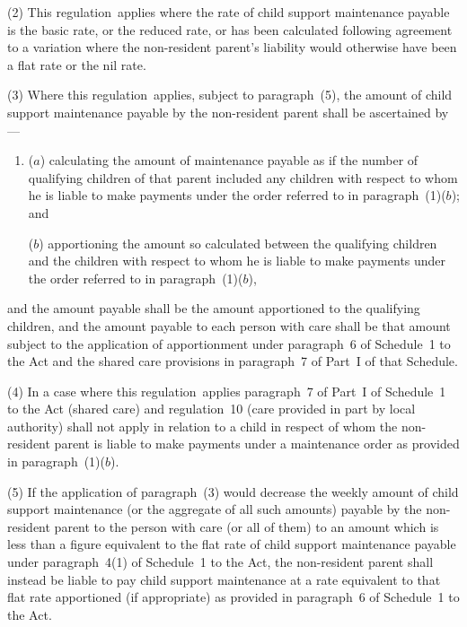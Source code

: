 \documentclass[12pt,a4paper]{article}
\begin{document}
(2) This regulation~applies where the rate of child support maintenance payable is the basic rate, or the reduced rate, or has been calculated following agreement to a variation where the non-resident parent’s liability would otherwise have been a flat rate or the nil rate.

(3) Where this regulation~applies, 
subject to paragraph~(5),  %
the amount of child support maintenance payable by the non-resident parent shall be ascertained by—
\begin{enumerate}\item[]
($a$) calculating the amount of maintenance payable as if the number of qualifying children of that parent included any children with respect to whom he is liable to make payments under the order referred to in paragraph~(1)($b$); and

($b$) apportioning the amount so calculated between the qualifying children and the children with respect to whom he is liable to make payments under the order referred to in paragraph~(1)($b$),
\end{enumerate}
and the amount payable shall be the amount apportioned to the qualifying children, and the amount payable to each person with care shall be that amount subject to the application of apportionment under paragraph~6 of Schedule~1 to the Act and the shared care provisions in paragraph~7 of Part~I of that Schedule.

(4) In a case where this regulation~applies paragraph~7 of Part~I of Schedule~1 to the Act (shared care) and regulation~10 (care provided in part by local authority) shall not apply in relation to a child in respect of whom the non-resident parent is liable to make payments under a maintenance order as provided in paragraph~(1)($b$).

\begin{sloppypar}
(5) If the application of paragraph~(3) would decrease the weekly amount of child support maintenance (or the aggregate of all such amounts) payable by the non-resident parent to the person with care (or all of them) to an amount which is less than a figure equivalent to the flat rate of child support maintenance payable under paragraph~4(1) of Schedule~1 to the Act, the non-resident parent shall instead be liable to pay child support maintenance at a rate equivalent to that flat rate apportioned (if appropriate) as provided in paragraph~6 of Schedule~1 to the Act.
\end{sloppypar}
\end{document}
